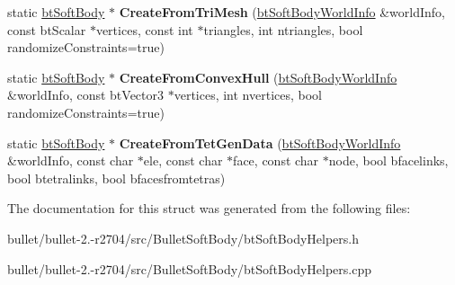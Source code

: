 \begin{DoxyCompactItemize}
\item 
\hypertarget{structbt_soft_body_helpers_a272cdc7d6d2ad911550d823419bdd3e7}{static \hyperlink{classbt_soft_body}{bt\+Soft\+Body} $\ast$ {\bfseries Create\+From\+Tri\+Mesh} (\hyperlink{structbt_soft_body_world_info}{bt\+Soft\+Body\+World\+Info} \&world\+Info, const bt\+Scalar $\ast$vertices, const int $\ast$triangles, int ntriangles, bool randomize\+Constraints=true)}\label{structbt_soft_body_helpers_a272cdc7d6d2ad911550d823419bdd3e7}

\item 
\hypertarget{structbt_soft_body_helpers_a3d1d3a92e3765a9445488cd098b3847d}{static \hyperlink{classbt_soft_body}{bt\+Soft\+Body} $\ast$ {\bfseries Create\+From\+Convex\+Hull} (\hyperlink{structbt_soft_body_world_info}{bt\+Soft\+Body\+World\+Info} \&world\+Info, const bt\+Vector3 $\ast$vertices, int nvertices, bool randomize\+Constraints=true)}\label{structbt_soft_body_helpers_a3d1d3a92e3765a9445488cd098b3847d}

\item 
\hypertarget{structbt_soft_body_helpers_a33f3787c9208680112c66fa8b1757c77}{static \hyperlink{classbt_soft_body}{bt\+Soft\+Body} $\ast$ {\bfseries Create\+From\+Tet\+Gen\+Data} (\hyperlink{structbt_soft_body_world_info}{bt\+Soft\+Body\+World\+Info} \&world\+Info, const char $\ast$ele, const char $\ast$face, const char $\ast$node, bool bfacelinks, bool btetralinks, bool bfacesfromtetras)}\label{structbt_soft_body_helpers_a33f3787c9208680112c66fa8b1757c77}

\end{DoxyCompactItemize}


The documentation for this struct was generated from the following files\+:\begin{DoxyCompactItemize}
\item 
bullet/bullet-\/2.-\/r2704/src/\+Bullet\+Soft\+Body/bt\+Soft\+Body\+Helpers.\+h\item 
bullet/bullet-\/2.-\/r2704/src/\+Bullet\+Soft\+Body/bt\+Soft\+Body\+Helpers.\+cpp\end{DoxyCompactItemize}
